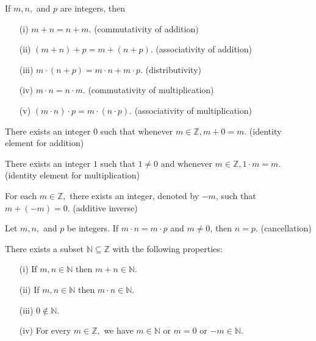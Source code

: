 \documentclass[12pt]{article}
\newenvironment{customaxiom}[1]{
  \renewcommand\theaxiom{#1}
  \axiom
}{\endaxiom}
\begin{document}
\pagestyle{fancy}
\fancyhf{} %
\fancyhead[R]{\today}
\setlength{\headheight}{41.54604pt}
\addtolength{\topmargin}{-27.04604pt}


\begin{customaxiom}{1.1}
  If \( m, n, \) and \( p \) are integers, then
  \begin{enumerate}
    \item[(i)] \( m + n = n + m \). \hfill (commutativity of addition)
    \item[(ii)] \( (m + n) + p = m + (n + p) \). \hfill (associativity of addition)
    \item[(iii)] \( m \cdot (n + p) = m \cdot n + m \cdot p \). \hfill (distributivity)
    \item[(iv)] \( m \cdot n = n \cdot m \). \hfill (commutativity of multiplication)
    \item[(v)] \( (m \cdot n) \cdot p = m \cdot (n \cdot p) \). \hfill (associativity of multiplication)
  \end{enumerate}
\end{customaxiom}

\begin{customaxiom}{1.2}
  There exists an integer \( 0 \) such that whenever \( m \in \mathbb{Z}, m + 0 = m \). \hfill (identity element for addition)
\end{customaxiom}

\begin{customaxiom}{1.3}
  There exists an integer \( 1 \) such that \( 1 \neq 0 \) and whenever \( m \in \mathbb{Z}, 1 \cdot m = m \). \hfill (identity element for multiplication)
\end{customaxiom}

\begin{customaxiom}{1.4}
  For each \( m \in \mathbb{Z}, \) there exists an integer, denoted by \( -m \), such that \( m + (-m) = 0 \). \hfill (additive inverse)
\end{customaxiom}

\begin{customaxiom}{1.5}
  Let \( m, n, \) and \( p \) be integers. If \( m \cdot n = m \cdot p \) and \( m \neq 0 \), then \( n = p \). \hfill (cancellation)
\end{customaxiom}

\begin{customaxiom}{2.1}
  There exists a subset \( \mathbb{N} \subseteq \mathbb{Z} \) with the following properties:
  \begin{enumerate}
    \item[(i)] If \( m, n \in \mathbb{N} \) then \( m + n \in \mathbb{N} \).
    \item[(ii)] If \( m, n \in \mathbb{N} \) then \( m \cdot n \in \mathbb{N} \).
    \item[(iii)] \( 0 \notin \mathbb{N} \).
    \item[(iv)] For every \( m \in \mathbb{Z}, \) we have \( m \in \mathbb{N} \) or \( m = 0 \) or \( -m \in \mathbb{N} \).
  \end{enumerate}
\end{customaxiom}
\end{document}
